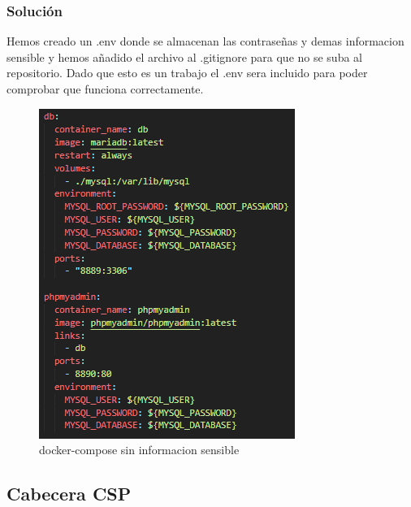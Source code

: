 \documentclass{report}
\begin{document}
                \subsubsection{Solución}
                    Hemos creado un .env donde se almacenan las contraseñas y demas informacion sensible y hemos añadido el archivo al .gitignore para que no se suba al repositorio.
                    Dado que esto es un trabajo el .env sera incluido para poder comprobar que funciona correctamente.
                    \begin{figure}[H]
                        \centering
                        \includegraphics[width=\textwidth]{./img/vulnerabilidades/3.5/1.1.png}
                        \caption{docker-compose sin informacion sensible}
                    \end{figure}
            \clearpage
            \subsection{Cabecera CSP}
\end{document}
